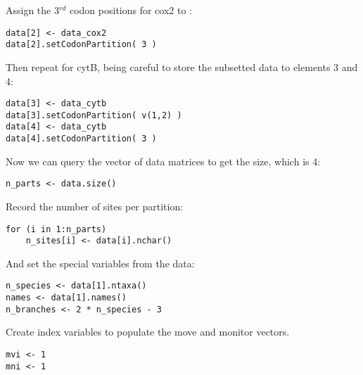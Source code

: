 Assign the 3$^{rd}$ codon positions for cox2 to :
{\tt \begin{snugshade*}
\begin{lstlisting}
data[2] <- data_cox2
data[2].setCodonPartition( 3 )
\end{lstlisting}
\end{snugshade*}}

Then repeat for cytB, being careful to store the subsetted data to elements 3 and 4:
{\tt \begin{snugshade*}
\begin{lstlisting}
data[3] <- data_cytb
data[3].setCodonPartition( v(1,2) )
data[4] <- data_cytb
data[4].setCodonPartition( 3 )
\end{lstlisting}
\end{snugshade*}}

Now we can query the vector of data matrices to get the size, which is 4:
{\tt \begin{snugshade*}
\begin{lstlisting}
n_parts <- data.size()
\end{lstlisting}
\end{snugshade*}}

Record the number of sites per partition:
{\tt \begin{snugshade*}
\begin{lstlisting}
for (i in 1:n_parts)
    n_sites[i] <- data[i].nchar()
\end{lstlisting}
\end{snugshade*}}

And set the special variables from the data:
{\tt \begin{snugshade*}
\begin{lstlisting}
n_species <- data[1].ntaxa()
names <- data[1].names()
n_branches <- 2 * n_species - 3
\end{lstlisting}
\end{snugshade*}}

Create index variables to populate the move and monitor vectors.
{\tt \begin{snugshade*}
\begin{lstlisting}
mvi <- 1
mni <- 1
\end{lstlisting}
\end{snugshade*}}


